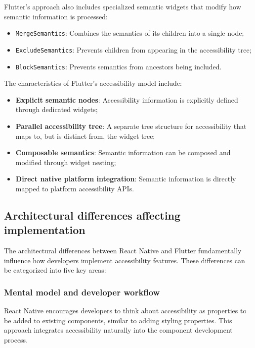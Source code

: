 Flutter's approach also includes specialized semantic widgets that modify how semantic information is processed:

\begin{itemize}
    \item \texttt{MergeSemantics}: Combines the semantics of its children into a single node;
    \item \texttt{ExcludeSemantics}: Prevents children from appearing in the accessibility tree;
    \item \texttt{BlockSemantics}: Prevents semantics from ancestors being included.
\end{itemize}

The characteristics of Flutter's accessibility model include:

\begin{itemize}
    \item \textbf{Explicit semantic nodes}: Accessibility information is explicitly defined through dedicated widgets;
    \item \textbf{Parallel accessibility tree}: A separate tree structure for accessibility that maps to, but is distinct from, the widget tree;
    \item \textbf{Composable semantics}: Semantic information can be composed and modified through widget nesting;
    \item \textbf{Direct native platform integration}: Semantic information is directly mapped to platform accessibility APIs.
\end{itemize}

\subsection{Architectural differences affecting implementation}

The architectural differences between React Native and Flutter fundamentally influence how developers implement accessibility features. These differences can be categorized into five key areas:

\subsubsection{Mental model and developer workflow}
React Native encourages developers to think about accessibility as properties to be added to existing components, similar to adding styling properties. This approach integrates accessibility naturally into the component development process.


